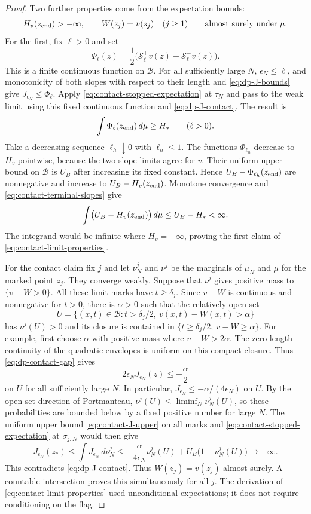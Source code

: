 \documentclass[11pt]{article}
\numberwithin{equation}{section}
\theoremstyle{definition}
\theoremstyle{remark}
\newcommand{\Senv}{\mathcal{S}}
\begin{document}
\begin{proof}
Two further properties come from the expectation bounds:
\begin{equation}\label{eq:contact-limit-properties}
  H_v(z_{\rm end})>-\infty,\qquad W(z_j)=v(z_j)\quad(j\ge1)
  \qquad\text{almost surely under }\mu.
\end{equation}
For the first, fix $\ell>0$ and set
\[
  \Phi_\ell(z)=\frac12\bigl(\Senv^+_\ell v(z)+\Senv^-_\ell v(z)\bigr).
\]
This is a finite continuous function on $\mathcal B$.  For all sufficiently
large $N$, $\epsilon_N\le\ell$, and monotonicity of both slopes with respect
to their length and \eqref{eq:dp-J-bounds} give
$J_{\epsilon_N}\le\Phi_\ell$.  Apply
\eqref{eq:contact-stopped-expectation} at $\tau_N$ and pass to the weak limit
using this fixed continuous function and \eqref{eq:dp-J-contact}.  The
result is
\begin{equation}\label{eq:contact-terminal-slopes}
  \int\Phi_\ell(z_{\rm end})\,d\mu\ge H_*\qquad(\ell>0).
\end{equation}
Take a decreasing sequence $\ell_h\downarrow0$ with $\ell_h\le1$.  The
functions $\Phi_{\ell_h}$ decrease to $H_v$ pointwise, because the two slope
limits agree for $v$.  Their uniform upper bound on $\mathcal B$ is $U_B$
after increasing its fixed constant.  Hence
$U_B-\Phi_{\ell_h}(z_{\rm end})$ are nonnegative and increase to
$U_B-H_v(z_{\rm end})$.  Monotone convergence and
\eqref{eq:contact-terminal-slopes} give
\[
  \int\bigl(U_B-H_v(z_{\rm end})\bigr)\,d\mu\le U_B-H_*<\infty.
\]
The integrand would be infinite where $H_v=-\infty$, proving the first
claim of \eqref{eq:contact-limit-properties}.

For the contact claim fix $j$ and let $\nu_N^j$ and $\nu^j$ be the marginals
of $\mu_N$ and $\mu$ for the marked point $z_j$.  They converge weakly.
Suppose that $\nu^j$ gives positive mass to $\{v-W>0\}$.  All these limit
marks have $t\ge\delta_j$.  Since $v-W$ is continuous and nonnegative for
$t>0$, there is $\alpha>0$ such that the relatively open set
\[
  U=\{(x,t)\in\mathcal B:t>\delta_j/2,\ v(x,t)-W(x,t)>\alpha\}
\]
has $\nu^j(U)>0$ and its closure is contained in
$\{t\ge\delta_j/2,\ v-W\ge\alpha\}$.  For example, first choose $\alpha$
with positive mass where $v-W>2\alpha$.  The zero-length continuity of the
quadratic envelopes is uniform on this compact closure.  Thus
\eqref{eq:dp-contact-gap} gives
\[
  2\epsilon_NJ_{\epsilon_N}(z)
   \le-\frac{\alpha}{2}
\]
on $U$ for all sufficiently large $N$.  In particular,
$J_{\epsilon_N}\le-\alpha/(4\epsilon_N)$ on $U$.  By the open-set direction
of Portmanteau, $\nu^j(U)\le\liminf_N\nu_N^j(U)$, so these probabilities
are bounded below by a fixed positive number for large $N$.  The uniform
upper bound \eqref{eq:contact-J-upper} on all marks and
\eqref{eq:contact-stopped-expectation} at $\sigma_{j,N}$ would then give
\[
  J_{\epsilon_N}(z_*)\le\int J_{\epsilon_N}\,d\nu_N^j
  \le-\frac{\alpha}{4\epsilon_N}\nu_N^j(U)
      +U_B\bigl(1-\nu_N^j(U)\bigr)\longrightarrow-\infty.
\]
This contradicts \eqref{eq:dp-J-contact}.  Thus $W(z_j)=v(z_j)$ almost
surely.  A countable intersection proves this simultaneously for all $j$.
The derivation of \eqref{eq:contact-limit-properties} used unconditional
expectations; it does not require conditioning on the flag.


\end{proof}
\end{document}
